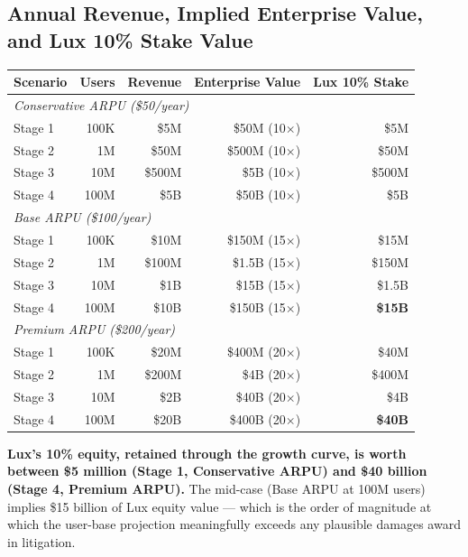 \documentclass[11pt,letterpaper]{article}
\begin{document}
\subsection*{Annual Revenue, Implied Enterprise Value, and Lux 10\%
Stake Value}

\begin{center}
\begin{small}
\begin{tabular}{lrrrr}
\toprule
\textbf{Scenario} & \textbf{Users} & \textbf{Revenue} & \textbf{Enterprise Value} & \textbf{Lux 10\% Stake} \\
\midrule
\multicolumn{5}{l}{\textit{Conservative ARPU (\$50/year)}} \\
Stage 1 & 100K & \$5M & \$50M (10$\times$) & \$5M \\
Stage 2 & 1M & \$50M & \$500M (10$\times$) & \$50M \\
Stage 3 & 10M & \$500M & \$5B (10$\times$) & \$500M \\
Stage 4 & 100M & \$5B & \$50B (10$\times$) & \$5B \\
\midrule
\multicolumn{5}{l}{\textit{Base ARPU (\$100/year)}} \\
Stage 1 & 100K & \$10M & \$150M (15$\times$) & \$15M \\
Stage 2 & 1M & \$100M & \$1.5B (15$\times$) & \$150M \\
Stage 3 & 10M & \$1B & \$15B (15$\times$) & \$1.5B \\
Stage 4 & 100M & \$10B & \$150B (15$\times$) & \textbf{\$15B} \\
\midrule
\multicolumn{5}{l}{\textit{Premium ARPU (\$200/year)}} \\
Stage 1 & 100K & \$20M & \$400M (20$\times$) & \$40M \\
Stage 2 & 1M & \$200M & \$4B (20$\times$) & \$400M \\
Stage 3 & 10M & \$2B & \$40B (20$\times$) & \$4B \\
Stage 4 & 100M & \$20B & \$400B (20$\times$) & \textbf{\$40B} \\
\bottomrule
\end{tabular}
\end{small}
\end{center}

\textbf{Lux's 10\% equity, retained through the growth curve, is
worth between \$5 million (Stage 1, Conservative ARPU) and \$40
billion (Stage 4, Premium ARPU).} The mid-case (Base ARPU at 100M
users) implies \$15 billion of Lux equity value --- which is the
order of magnitude at which the user-base projection meaningfully
exceeds any plausible damages award in litigation.
\end{document}
